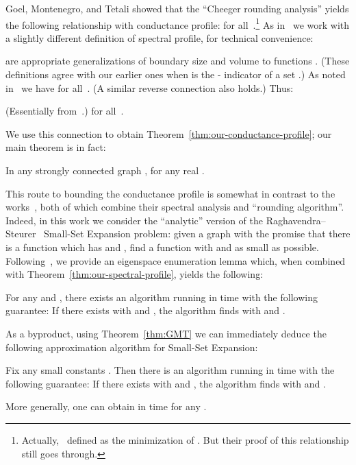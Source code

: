 \documentclass[11pt]{article}
\begin{document}
Goel, Montenegro, and Tetali showed that the ``Cheeger rounding analysis'' yields the following relationship with conductance profile:  for all~.\footnote{Actually,~\cite{GMT06} defined  as the minimization of . But their proof of this relationship still goes through.} As in~\cite{ABS10} we work with a slightly different definition of spectral profile, for technical convenience:

are appropriate generalizations of boundary size and volume to functions .  (These definitions agree with our earlier ones when  is the - indicator of a set .)  As noted in~\cite[Lemma~A.2]{ABS10} we have  for all~.  (A similar reverse connection also holds.)  Thus:
\begin{theorem} \label{thm:GMT} (Essentially from~\cite{GMT06}.)  for all~.
\end{theorem}

We use this connection to obtain Theorem~\ref{thm:our-conductance-profile}; our main theorem is in fact:
\begin{theorem} \label{thm:our-spectral-profile}
    In any strongly connected graph ,  for any real .
\end{theorem}
This route to bounding the conductance profile is somewhat in contrast to the works~\cite{LRTV12,LOT12}, both of which combine their spectral analysis and ``rounding algorithm''.\\

Indeed, in this work we consider the ``analytic'' version of the Raghavendra--Steurer~\cite{RS10} Small-Set Expansion problem: given a graph  with the promise that there is a function  which has  and , find a function  with  and  as small as possible.  Following~\cite{ABS10}, we provide an eigenspace enumeration lemma which, when combined with Theorem~\ref{thm:our-spectral-profile}, yields the following:
\begin{theorem} \label{thm:our-alg}
    For any  and , there exists an algorithm running in time  with the following guarantee:  If there exists  with  and , the algorithm finds  with  and .
\end{theorem}

As a byproduct, using Theorem~\ref{thm:GMT} we can immediately deduce the following approximation algorithm for Small-Set Expansion:
\begin{corollary} \label{cor:alg}
    Fix any small constants .  Then there is an algorithm running in time  with the following guarantee:  If there exists  with  and , the algorithm finds  with  and .

    More generally, one can obtain  in time  for any .
\end{corollary}
\end{document}
